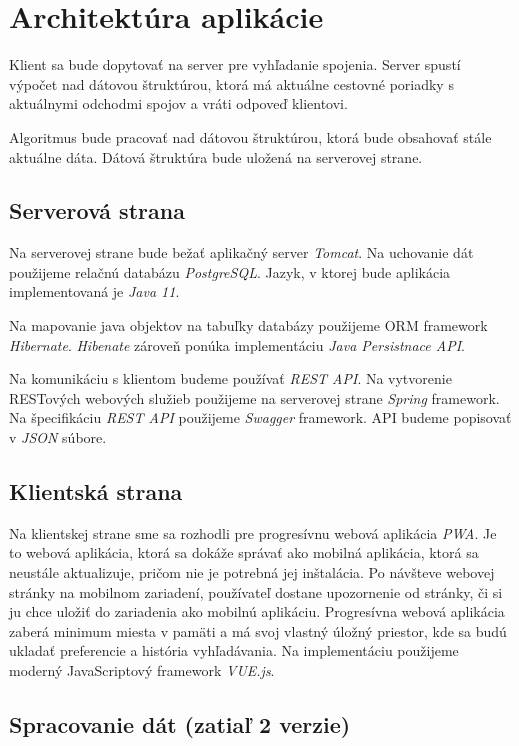 \section{Architektúra aplikácie}

Klient sa bude dopytovať na server pre vyhľadanie spojenia. Server spustí výpočet nad dátovou štruktúrou, ktorá má aktuálne cestovné poriadky s aktuálnymi odchodmi spojov a vráti odpoveď klientovi.

Algoritmus bude pracovať nad dátovou štruktúrou, ktorá bude obsahovať stále aktuálne dáta. Dátová štruktúra bude uložená na serverovej strane. 

\subsection{Serverová strana}
Na serverovej strane bude bežať aplikačný server \textit{Tomcat}. Na uchovanie dát použijeme relačnú databázu \textit{PostgreSQL}. Jazyk, v ktorej bude aplikácia implementovaná je \textit{Java 11}.
 
Na mapovanie java objektov na tabuľky databázy použijeme ORM framework \textit{Hibernate}. \textit{Hibenate} zároveň ponúka implementáciu \textit{Java Persistnace API}. 

Na komunikáciu s klientom budeme používať \textit{REST API}. Na vytvorenie RESTových webových služieb použijeme na serverovej strane \textit{Spring} framework. Na špecifikáciu \textit{REST API} použijeme \textit{Swagger }framework. API budeme popisovať v \textit{JSON} súbore. 

\subsection{Klientská strana}
Na klientskej strane sme sa rozhodli pre progresívnu webová aplikácia \textit{PWA}. Je to webová aplikácia, ktorá sa dokáže správať ako mobilná aplikácia, ktorá sa neustále aktualizuje, pričom nie je potrebná jej inštalácia. Po návšteve webovej stránky na mobilnom zariadení, používateľ dostane upozornenie od stránky, či si ju chce uložiť do zariadenia ako mobilnú aplikáciu. Progresívna webová aplikácia zaberá minimum miesta v pamäti a má svoj vlastný úložný priestor, kde sa budú ukladať preferencie a história vyhľadávania.
Na implementáciu použijeme moderný JavaScriptový framework \textit{VUE.js}.

\subsection{Spracovanie dát (zatiaľ 2 verzie)}
